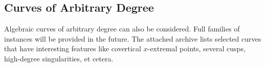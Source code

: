 \subsection{Curves of Arbitrary Degree\label{bi_sec:Arrangement2AlgebraicCurve2}}

Algebraic curves of arbitrary degree can also be considered. Full families
of instances will be provided in the future. The attached archive
lists selected curves that have interesting features like covertical 
$x$-extremal points, several cusps, high-degree singularities, et cetera.



